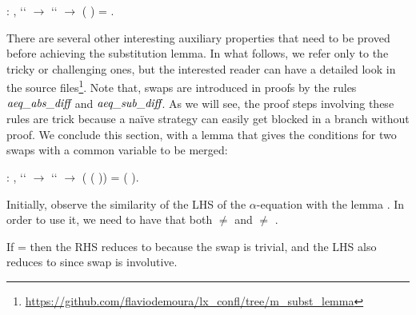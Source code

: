 \begin{coqdoccode}
\coqdocemptyline
\coqdocnoindent
{} : \coqdockw{\ensuremath{\forall}}   ,  ``   \ensuremath{\rightarrow}  ``   \ensuremath{\rightarrow} (   ) =  .\coqdoceol
\coqdocemptyline
\coqdocemptyline
\end{coqdoccode}
There are several other interesting auxiliary properties that need to be proved before achieving the substitution lemma. In what follows, we refer only to the tricky or challenging ones, but the interested reader can have a detailed look in the source files\footnote{\url{https://github.com/flaviodemoura/lx_confl/tree/m_subst_lemma}}. Note that, swaps are introduced in proofs by the rules $\mbox{\it aeq}\_\mbox{\it abs}\_\mbox{\it diff}$ and $\mbox{\it aeq}\_\mbox{\it sub}\_\mbox{\it diff}$. As we will see, the proof steps involving these rules are trick because a naïve strategy can easily get blocked in a branch without proof. We conclude this section, with a lemma that gives the conditions for two swaps with a common variable to be merged: 
\begin{coqdoccode}
\coqdocemptyline
\coqdocnoindent
{} : \coqdockw{\ensuremath{\forall}}    ,  ``   \ensuremath{\rightarrow}  ``   \ensuremath{\rightarrow} (   (   )) = (   ).\coqdoceol
\end{coqdoccode}
 Initially, observe the similarity of the LHS of the $\alpha$-equation with the lemma . In order to use it, we need to have that both  \ensuremath{\not=}  and  \ensuremath{\not=} . 
\begin{coqdoccode}
\end{coqdoccode}
If  =  then the RHS reduces to  because the swap is trivial, and the LHS also reduces to  since swap is involutive.
\begin{coqdoccode}
\end{coqdoccode}
